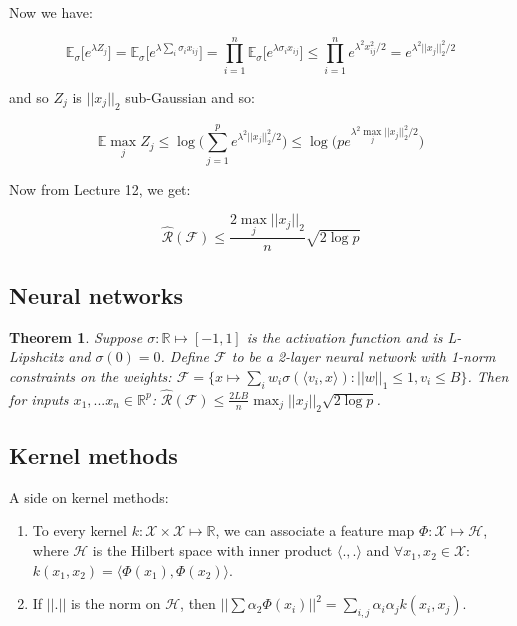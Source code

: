 \documentclass[10pt]{article}
\newcounter{lecnum}
\newtheorem{theorem}{Theorem}[lecnum]
\renewcommand{\hat}{\widehat}
\begin{document}
Now we have:

\begin{equation}
 \mathbb{E}_\sigma \big[ e^{\lambda Z_j} \big] =  \mathbb{E}_\sigma \big[ e^{\lambda \sum_i \sigma_i x_{ij}} \big]=\prod_{i=1}^{n} \mathbb{E}_\sigma \big[ e^{\lambda \sigma_i x_{ij}} \big]  \le \prod_{i=1}^{n}  e^{\lambda^2  x_{ij}^2 / 2} = e^{\lambda^2  ||x_{j}||_2^2 / 2}
\end{equation} 

\noindent and so $Z_j$ is $||x_j||_2$ sub-Gaussian and so:

\begin{equation}
\mathbb{E} \max_j Z_j \le \log\bigg( \sum_{j=1}^{p}  e^{\lambda^2  ||x_{j}||_2^2 / 2} \bigg) \le \log \bigg( p e^{\lambda^2  \max_j ||x_{j}||_2^2 / 2} \bigg)
\end{equation}

Now from Lecture 12, we get:

\begin{equation}
\hat{\mathcal{R}}(\mathcal{F}) \le \frac{2 \max_j ||x_j||_2}{n} \sqrt{2 \log p}
\end{equation}

\subsection{Neural networks}

\begin{theorem}
	Suppose $\sigma:\mathbb{R} \longmapsto [-1,1]$ is the activation function and is L-Lipshcitz and $\sigma(0)=0$. Define $\mathcal{F}$ to be a 2-layer neural network with 1-norm constraints on the weights: $\mathcal{F}=\{x \longmapsto \sum_i w_i \sigma(\langle v_i,x \rangle)  : ||w||_1 \le 1, v_i \le B\}$. Then for inputs $x_1,...x_n \in \mathbb{R}^p$: $\hat{\mathcal{R}}(\mathcal{F}) \le \frac{2LB}{n} \max_j ||x_j||_2  \sqrt{2 \log p}$.
\end{theorem}
 
\subsection{Kernel methods}

A side on kernel methods: 

\begin{enumerate}
	\item To every kernel $k: \mathcal{X} \times \mathcal{X} \longmapsto \mathbb{R}$, we can associate a feature map $\Phi: \mathcal{X} \longmapsto \mathcal{H}$, where $\mathcal{H}$ is the Hilbert space with inner product $\langle .,. \rangle$ and $\forall x_1,x_2 \in \mathcal{X}$: $k(x_1,x_2)=\langle \Phi(x_1),\Phi(x_2) \rangle$.
	
	\item If $||.||$ is the norm on $\mathcal{H}$, then $||\sum\alpha_2 \Phi(x_i)||^2=\sum_{i,j}\alpha_i\alpha_j k(x_i,x_j)$.
\end{enumerate}
 
\end{document}
